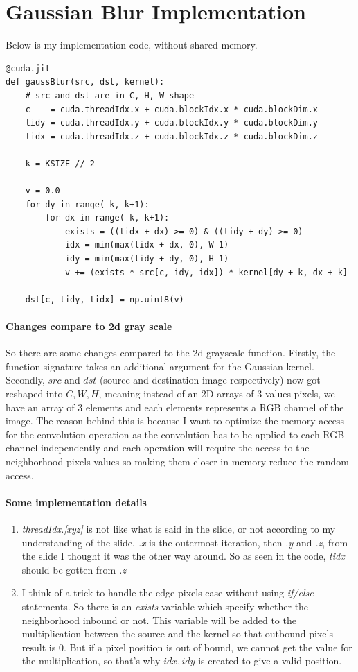 \documentclass{article}
\begin{document}
\section{Gaussian Blur Implementation}
Below is my implementation code, without shared memory.
\begin{verbatim}
@cuda.jit
def gaussBlur(src, dst, kernel):
    # src and dst are in C, H, W shape
    c    = cuda.threadIdx.x + cuda.blockIdx.x * cuda.blockDim.x
    tidy = cuda.threadIdx.y + cuda.blockIdx.y * cuda.blockDim.y
    tidx = cuda.threadIdx.z + cuda.blockIdx.z * cuda.blockDim.z

    k = KSIZE // 2

    v = 0.0
    for dy in range(-k, k+1):
        for dx in range(-k, k+1):
            exists = ((tidx + dx) >= 0) & ((tidy + dy) >= 0)
            idx = min(max(tidx + dx, 0), W-1)
            idy = min(max(tidy + dy, 0), H-1)
            v += (exists * src[c, idy, idx]) * kernel[dy + k, dx + k]
    
    dst[c, tidy, tidx] = np.uint8(v)
\end{verbatim}

\paragraph{Changes compare to 2d gray scale} So there are some changes compared to the 2d grayscale function.
Firstly, the function signature takes an additional argument for the Gaussian kernel.
Secondly, $src$ and $dst$ (source and destination image respectively) now got reshaped into $C, W, H$, meaning instead of an 2D arrays of 3 values pixels, we have an array of 3 elements and each elements represents a RGB channel of the image.
The reason behind this is because I want to optimize the memory access for the convolution operation as the convolution has to be applied to each RGB channel independently and each operation will require the access to the neighborhood pixels values so making them closer in memory reduce the random access.

\paragraph{Some implementation details}
\begin{enumerate}
\item \textit{threadIdx.[xyz]} is not like what is said in the slide, or not according to my understanding of the slide. \textit{.x} is the outermost iteration, then \textit{.y} and \textit{.z}, from the slide I thought it was the other way around. So as seen in the code, \textit{tidx} should be gotten from \textit{.z}
\item I think of a trick to handle the edge pixels case without using \textit{if/else} statements. So there is an \textit{exists} variable which specify whether the neighborhood inbound or not. This variable will be added to the multiplication between the source and the kernel so that outbound pixels result is $0$. But if a pixel position is out of bound, we cannot get the value for the multiplication, so that's why $idx, idy$ is created to give a valid position.
\end{enumerate}
\end{document}
